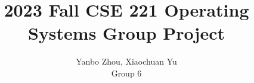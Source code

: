 \documentclass[letterpaper,twocolumn,10pt]{usetex-v1}
\begin{document}

\date{}

\title{2023 Fall CSE 221 Operating Systems Group Project}

\author{{Yanbo Zhou, Xiaochuan Yu} \\ Group 6}

\maketitle







\clearpage



%
\end{document}
